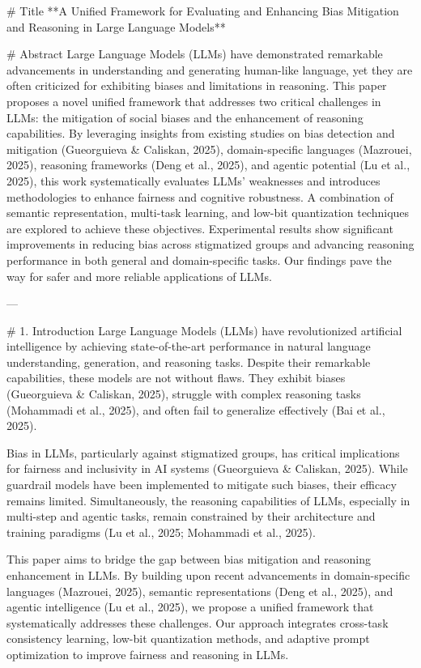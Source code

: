 # Title
**A Unified Framework for Evaluating and Enhancing Bias Mitigation and Reasoning in Large Language Models**

# Abstract
Large Language Models (LLMs) have demonstrated remarkable advancements in understanding and generating human-like language, yet they are often criticized for exhibiting biases and limitations in reasoning. This paper proposes a novel unified framework that addresses two critical challenges in LLMs: the mitigation of social biases and the enhancement of reasoning capabilities. By leveraging insights from existing studies on bias detection and mitigation (Gueorguieva & Caliskan, 2025), domain-specific languages (Mazrouei, 2025), reasoning frameworks (Deng et al., 2025), and agentic potential (Lu et al., 2025), this work systematically evaluates LLMs' weaknesses and introduces methodologies to enhance fairness and cognitive robustness. A combination of semantic representation, multi-task learning, and low-bit quantization techniques are explored to achieve these objectives. Experimental results show significant improvements in reducing bias across stigmatized groups and advancing reasoning performance in both general and domain-specific tasks. Our findings pave the way for safer and more reliable applications of LLMs.

---

# 1. Introduction
Large Language Models (LLMs) have revolutionized artificial intelligence by achieving state-of-the-art performance in natural language understanding, generation, and reasoning tasks. Despite their remarkable capabilities, these models are not without flaws. They exhibit biases (Gueorguieva & Caliskan, 2025), struggle with complex reasoning tasks (Mohammadi et al., 2025), and often fail to generalize effectively (Bai et al., 2025).

Bias in LLMs, particularly against stigmatized groups, has critical implications for fairness and inclusivity in AI systems (Gueorguieva & Caliskan, 2025). While guardrail models have been implemented to mitigate such biases, their efficacy remains limited. Simultaneously, the reasoning capabilities of LLMs, especially in multi-step and agentic tasks, remain constrained by their architecture and training paradigms (Lu et al., 2025; Mohammadi et al., 2025).

This paper aims to bridge the gap between bias mitigation and reasoning enhancement in LLMs. By building upon recent advancements in domain-specific languages (Mazrouei, 2025), semantic representations (Deng et al., 2025), and agentic intelligence (Lu et al., 2025), we propose a unified framework that systematically addresses these challenges. Our approach integrates cross-task consistency learning, low-bit quantization methods, and adaptive prompt optimization to improve fairness and reasoning in LLMs.

